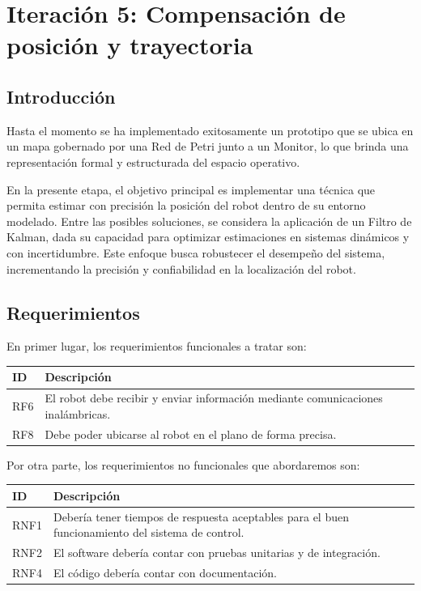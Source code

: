 \newpage
\section{Iteración 5: Compensación de posición y trayectoria}

\subsection{Introducción}

Hasta el momento se ha implementado exitosamente un prototipo que se ubica en un mapa gobernado por una Red de Petri junto a un Monitor, lo que brinda una representación formal y estructurada del espacio operativo.

En la presente etapa, el objetivo principal es implementar una técnica que permita estimar con precisión la posición del robot dentro de su entorno modelado. Entre las posibles soluciones, se considera la aplicación de un Filtro de Kalman, dada su capacidad para optimizar estimaciones en sistemas dinámicos y con incertidumbre. Este enfoque busca robustecer el desempeño del sistema, incrementando la precisión y confiabilidad en la localización del robot.

\subsection{Requerimientos}

En primer lugar, los requerimientos funcionales a tratar son:

\begin{center}
\begin{tabular}{
    | >{\centering\arraybackslash}m{1cm}
    | >{\centering\arraybackslash}m{13cm} |
} 
\hline \rowcolor{test_header_color}
    ID & Descripción \\
\hline
    RF6 & El robot debe recibir y enviar información mediante comunicaciones inalámbricas. \\ 
\hline
    RF8 & Debe poder ubicarse al robot en el plano de forma precisa. \\
\hline
\end{tabular}
\end{center}

Por otra parte, los requerimientos no funcionales que abordaremos son:

\begin{center}
\begin{tabular}{
    | >{\centering\arraybackslash}m{1cm}
    | >{\centering\arraybackslash}m{13cm} |
}
\hline \rowcolor{test_header_color}
    ID & Descripción \\
\hline
    RNF1 & Debería tener tiempos de respuesta aceptables para el buen funcionamiento del sistema de control. \\
\hline
    RNF2 & El software debería contar con pruebas unitarias y de integración. \\
\hline
    RNF4 & El código debería contar con documentación. \\
\hline
\end{tabular}
\end{center}

